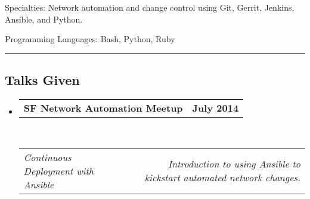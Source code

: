 \documentclass[10pt,letterpaper]{article}
\makeatletter
\newenvironment{indentsection}[1]%
{\begin{list}{}%
	{\setlength{\leftmargin}{#1}}%
	\item[]%
}
{\end{list}}
\newcommand{\headerrow}[2]
{\begin{tabular*}{\linewidth}{l@{\extracolsep{\fill}}r}
	#1 &
	#2 \\
\end{tabular*}}
\makeatother
\begin{document}
\begin{indentsection}{\parindent}
\begin{description*}
    \item[Specialties:]
        Network automation and change control using Git, Gerrit, Jenkins, Ansible, and Python.
    \item[Programming Languages:] 
        Bash, Python, Ruby
\end{description*}
\end{indentsection}


\hrule
\vspace{-0.4em}
\subsection*{Talks Given}

\begin{itemize}
    \parskip=0.1em

    \item
    \headerrow
        {\textbf{SF Network Automation Meetup}}
        {\textbf{July 2014}}
    \\
    \headerrow
        {\emph{Continuous Deployment with Ansible}}
        {\emph{Introduction to using Ansible to kickstart automated network changes.}}

\end{itemize}
\end{document}

